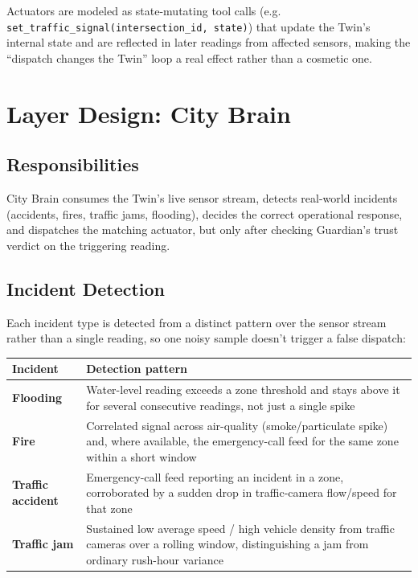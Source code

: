 \documentclass[10pt,letterpaper]{article}
\begin{document}
Actuators are modeled as state-mutating tool calls (e.g. \texttt{set\_traffic\_signal(intersection\_id, state)}) that update the Twin's internal state and are reflected in later readings from affected sensors, making the ``dispatch changes the Twin'' loop a real effect rather than a cosmetic one.

\section{Layer Design: City Brain}

\subsection{Responsibilities}

City Brain consumes the Twin's live sensor stream, detects real-world incidents (accidents, fires, traffic jams, flooding), decides the correct operational response, and dispatches the matching actuator, but only after checking Guardian's trust verdict on the triggering reading.

\subsection{Incident Detection}

Each incident type is detected from a distinct pattern over the sensor stream rather than a single reading, so one noisy sample doesn't trigger a false dispatch:

\begin{longtable}{p{1.3in} p{4.9in}}
\toprule
\textbf{Incident} & \textbf{Detection pattern} \\
\midrule
\endhead
\textbf{Flooding} & Water-level reading exceeds a zone threshold and stays above it for several consecutive readings, not just a single spike \\
\textbf{Fire} & Correlated signal across air-quality (smoke/particulate spike) and, where available, the emergency-call feed for the same zone within a short window \\
\textbf{Traffic accident} & Emergency-call feed reporting an incident in a zone, corroborated by a sudden drop in traffic-camera flow/speed for that zone \\
\textbf{Traffic jam} & Sustained low average speed / high vehicle density from traffic cameras over a rolling window, distinguishing a jam from ordinary rush-hour variance \\
\bottomrule
\end{longtable}
\end{document}
